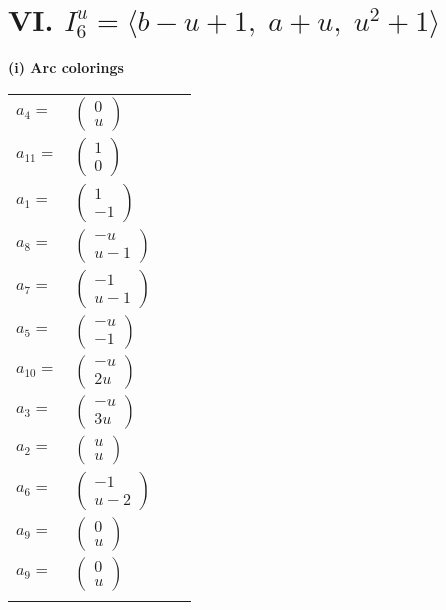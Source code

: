 \documentclass[1p]{elsarticle_modified}
\theoremstyle{definition}
\begin{document}
\centering \section*{VI. $I^u_{6}= \langle b- u+1,\;a+u,\;u^2+1 \rangle$}
\flushleft \textbf{(i) Arc colorings}\\
\begin{tabular}{m{7pt} m{180pt} m{7pt} m{180pt} }
\flushright $a_{4}=$&$\begin{pmatrix}0\\u\end{pmatrix}$ \\
\flushright $a_{11}=$&$\begin{pmatrix}1\\0\end{pmatrix}$ \\
\flushright $a_{1}=$&$\begin{pmatrix}1\\-1\end{pmatrix}$ \\
\flushright $a_{8}=$&$\begin{pmatrix}- u\\u-1\end{pmatrix}$ \\
\flushright $a_{7}=$&$\begin{pmatrix}-1\\u-1\end{pmatrix}$ \\
\flushright $a_{5}=$&$\begin{pmatrix}- u\\-1\end{pmatrix}$ \\
\flushright $a_{10}=$&$\begin{pmatrix}- u\\2 u\end{pmatrix}$ \\
\flushright $a_{3}=$&$\begin{pmatrix}- u\\3 u\end{pmatrix}$ \\
\flushright $a_{2}=$&$\begin{pmatrix}u\\u\end{pmatrix}$ \\
\flushright $a_{6}=$&$\begin{pmatrix}-1\\u-2\end{pmatrix}$ \\
\flushright $a_{9}=$&$\begin{pmatrix}0\\u\end{pmatrix}$\\ \flushright $a_{9}=$&$\begin{pmatrix}0\\u\end{pmatrix}$\\&\end{tabular}
\end{document}
